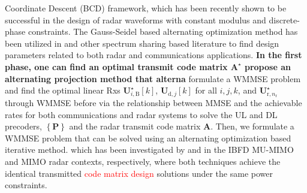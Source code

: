 \documentclass[10pt,journal]{IEEEtran}
\newcommand{\bracket}[1]{{\left [{#1}\right ]}}
\newcommand{\braces}[1]{{\left\{ {#1}\right\}}}
\newcommand{\B}{\textrm{B}}
\newcommand{\rnr}{_{\mathrm{r},n_\mathrm{r}}}
\newcommand{\UBj}{\mathbf{U}_{\textrm{d},j}\bracket{k}}
\theoremstyle{definition}
\begin{document}
	Coordinate Descent (BCD) framework, which has been recently
	shown to be successful in the design of radar waveforms with constant modulus and discrete-phase constraints. The Gauss-Seidel based alternating optimization method has been utilized in \cite{MCMIMO_RadComm,qian2018joint} and other spectrum sharing based literature to find design parameters related to both radar and communications applications.  \textbf{In the first phase, one can find an optimal transmit code matrix $\mathbf{A}^\star$ propose an alternating projection method that alterna}  formulate a WMMSE problem and find the optimal linear Rxs $\mathbf{U}^\star_{i,\B}\bracket{k}$, $\UBj$ for all $i,j,k$, and $\mathbf{U}^\star\rnr$ through WMMSE before  via the relationship between MMSE and the achievable rates for both communications and radar systems to solve the UL and DL precoders, $\braces{\mathbf{P}}$ and the radar transmit code matrix $\mathbf{A}$. Then, we formulate a WMMSE problem that can be solved using an alternating optimization based iterative method. which has been investigated by \cite{FD_WMMSE} and \cite{mutualinformation_mmse} in the IBFD MU-MIMO and MIMO radar contexts, respectively, where both techniques achieve the identical transmitted \textcolor{red}{code matrix design} solutions under the same power constraints.  
	\fi
\end{document}
